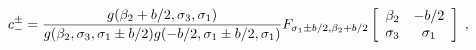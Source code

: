 \begin{equation}
c_{-}^{\pm}=\frac{g(\beta_{2}+b/2,\sigma_{3},\sigma_{1})}
{g(\beta_{2},\sigma_{3},\sigma_{1}\pm b/2)g(-b/2,\sigma_{1}\pm b/2
,\sigma_{1})}F_{\sigma_{1}\pm b/2,\beta_{2}+b/2}\left[
\begin{array}
[c]{cc}%
\beta_{2}     & -b/2\\
\sigma_{3}    & \sigma_{1}%
\end{array}
\right] \; ,\label{lala}\nonumber
\end{equation}

